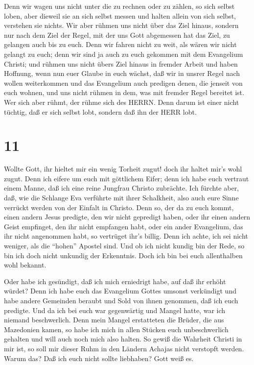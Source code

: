  Denn wir wagen uns nicht unter die zu rechnen oder zu
zählen, so sich selbst loben, aber dieweil sie an sich selbst messen und
halten allein von sich selbst, verstehen sie nichts.  Wir
aber rühmen uns nicht über das Ziel hinaus, sondern nur nach dem Ziel
der Regel, mit der uns Gott abgemessen hat das Ziel, zu gelangen auch
bis zu euch.  Denn wir fahren nicht zu weit, als wären wir
nicht gelangt zu euch; denn wir sind ja auch zu euch gekommen mit dem
Evangelium Christi;  und rühmen uns nicht übers Ziel hinaus
in fremder Arbeit und haben Hoffnung, wenn nun euer Glaube in euch
wächst, daß wir in unsrer Regel nach wollen weiterkommen 
und das Evangelium auch predigen denen, die jenseit von euch wohnen, und
uns nicht rühmen in dem, was mit fremder Regel bereitet ist.
 Wer sich aber rühmt, der rühme sich des HERRN.
 Denn darum ist einer nicht tüchtig, daß er sich selbst
lobt, sondern daß ihn der HERR lobt.

\hypertarget{section-10}{%
\section{11}\label{section-10}}

 Wollte Gott, ihr hieltet mir ein wenig Torheit zugut! doch
ihr haltet mir's wohl zugut.  Denn ich eifere um euch mit
göttlichem Eifer; denn ich habe euch vertraut einem Manne, daß ich eine
reine Jungfrau Christo zubrächte.  Ich fürchte aber, daß,
wie die Schlange Eva verführte mit ihrer Schalkheit, also auch eure
Sinne verrückt werden von der Einfalt in Christo.  Denn so,
der da zu euch kommt, einen andern Jesus predigte, den wir nicht
gepredigt haben, oder ihr einen andern Geist empfinget, den ihr nicht
empfangen habt, oder ein ander Evangelium, das ihr nicht angenommen
habt, so vertrüget ihr's billig.  Denn ich achte, ich sei
nicht weniger, als die ``hohen'' Apostel sind.  Und ob ich
nicht kundig bin der Rede, so bin ich doch nicht unkundig der
Erkenntnis. Doch ich bin bei euch allenthalben wohl bekannt.

 Oder habe ich gesündigt, daß ich mich erniedrigt habe, auf
daß ihr erhöht würdet? Denn ich habe euch das Evangelium Gottes umsonst
verkündigt  und habe andere Gemeinden beraubt und Sold von
ihnen genommen, daß ich euch predigte.  Und da ich bei euch
war gegenwärtig und Mangel hatte, war ich niemand beschwerlich. Denn
mein Mangel erstatteten die Brüder, die aus Mazedonien kamen, so habe
ich mich in allen Stücken euch unbeschwerlich gehalten und will auch
noch mich also halten.  So gewiß die Wahrheit Christi in
mir ist, so soll mir dieser Ruhm in den Ländern Achajas nicht verstopft
werden.  Warum das? Daß ich euch nicht sollte liebhaben?
Gott weiß es.

